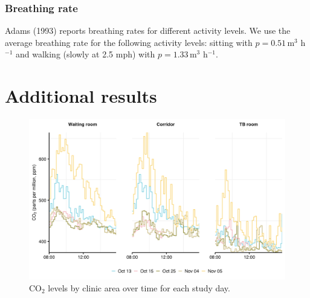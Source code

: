 \documentclass[fleqn,11pt]{wlscirep_supp}
\begin{document}
\subsubsection{Breathing rate}

Adams (1993)\cite{Adams1993} reports breathing rates for different activity levels. We use the average breathing rate for the following activity levels: sitting with $p = 0.51$\,m$^3$ h$^{-1}$ and walking (slowly at 2.5 mph) with $p = 1.33$\,m$^3$ h$^{-1}$. 

\clearpage

\section{Additional results}\label{sec:additional-results}


\begin{figure}[!htpb]
    \centering
    \includegraphics{results/data/co2-levels-over-time.png}
    \caption{CO$_2$ levels by clinic area over time for each study day.}
    \label{fig:co2-levels}
\end{figure}

\end{document}
